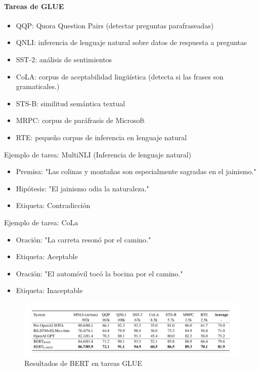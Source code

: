 \paragraph{Tareas de GLUE}
\begin{itemize}
\item QQP: Quora Question Pairs (detectar preguntas parafraseadas)
\item QNLI: inferencia de lenguaje natural sobre datos de respuesta a preguntas
\item SST-2: análisis de sentimientos
\item CoLA: corpus de aceptabilidad lingüística (detecta si las frases son gramaticales.)
\item STS-B: similitud semántica textual
\item MRPC: corpus de paráfrasis de Microsoft
\item RTE: pequeño corpus de inferencia en lenguaje natural
\end{itemize}


Ejemplo de tarea: MultiNLI (Inferencia de lenguaje natural)
\begin{itemize}
\item Premisa: "Las colinas y montañas son especialmente sagradas en el jainismo."
\item Hipótesis: "El jainismo odia la naturaleza."
\item Etiqueta: Contradicción
\end{itemize}

Ejemplo de tarea: CoLa
\begin{itemize}
\item Oración: "La carreta resonó por el camino."
\item Etiqueta: Aceptable
\end{itemize}
\begin{itemize}
\item Oración: "El automóvil tocó la bocina por el camino."
\item Etiqueta: Inaceptable
\end{itemize}

\begin{figure}[h]
  \centering
  \includegraphics[scale=0.26]{pics/BERTGLUE.png}
  \caption{Resultados de BERT en tareas GLUE}
\end{figure}

